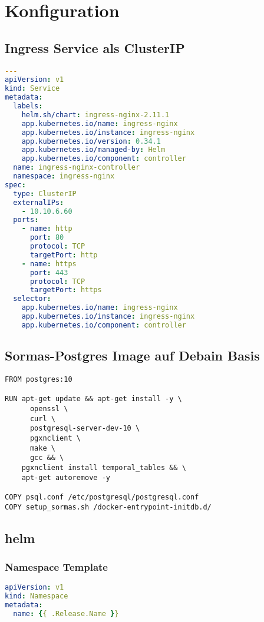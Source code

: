\chapter{Konfiguration}

\section{Ingress Service als ClusterIP}
\hfill \newline
\label{app:clusterip}
\begin{lstlisting}[language=yaml]
---
apiVersion: v1
kind: Service
metadata:
  labels:
    helm.sh/chart: ingress-nginx-2.11.1
    app.kubernetes.io/name: ingress-nginx
    app.kubernetes.io/instance: ingress-nginx
    app.kubernetes.io/version: 0.34.1
    app.kubernetes.io/managed-by: Helm
    app.kubernetes.io/component: controller
  name: ingress-nginx-controller
  namespace: ingress-nginx
spec:
  type: ClusterIP
  externalIPs:
    - 10.10.6.60
  ports:
    - name: http
      port: 80
      protocol: TCP
      targetPort: http
    - name: https
      port: 443
      protocol: TCP
      targetPort: https
  selector:
    app.kubernetes.io/name: ingress-nginx
    app.kubernetes.io/instance: ingress-nginx
    app.kubernetes.io/component: controller
\end{lstlisting}



\section{Sormas-Postgres Image auf Debain Basis }
\hfill \newline
\label{app:small_postgres}
\begin{lstlisting}[caption={Dockerfile für ein kleineres Image auf Debian Basis}]
FROM postgres:10

RUN apt-get update && apt-get install -y \
      openssl \
      curl \
      postgresql-server-dev-10 \
      pgxnclient \
      make \
      gcc && \
    pgxnclient install temporal_tables && \
    apt-get autoremove -y
    
COPY psql.conf /etc/postgresql/postgresql.conf
COPY setup_sormas.sh /docker-entrypoint-initdb.d/
\end{lstlisting}


\section{helm}


\subsection{Namespace Template}
\hfill\newline
\label{app:namespace_template}
\begin{lstlisting}[language=yaml]
apiVersion: v1
kind: Namespace
metadata:
  name: {{ .Release.Name }}
\end{lstlisting}

